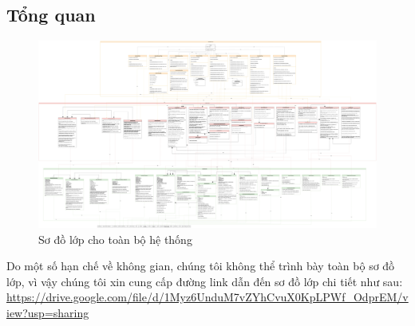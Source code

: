 \subsection{Tổng quan}
\begin{figure}[H]
    \centering
    \includegraphics[width=\linewidth]{Content/Phân tích và thiết kế hệ thống/documents/Sơ đồ lớp/images/LayerArchitect2.png}
    \vspace{0.5cm}
    \caption{Sơ đồ lớp cho toàn bộ hệ thống}
    \label{fig:Sơ đồ lớp cho toàn bộ hệ thống}
\end{figure}

\par
Do một số hạn chế về không gian, chúng tôi không thể trình bày toàn bộ sơ đồ lớp,
vì vậy chúng tôi xin cung cấp đường link dẫn đến sơ đồ lớp chi tiết như sau:
\url{https://drive.google.com/file/d/1Myz6UnduM7vZYhCvuX0KpLPWf_OdprEM/view?usp=sharing}